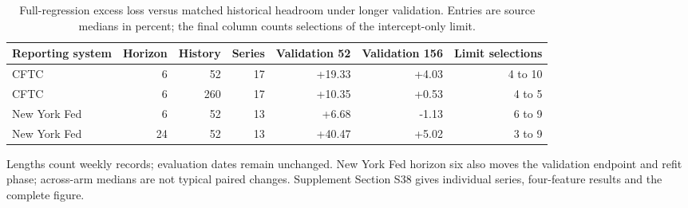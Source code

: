 \begin{table}[htbp]\centering\small
\caption{Full-regression excess loss versus matched historical headroom under longer validation. Entries are source medians in percent; the final column counts selections of the intercept-only limit.}\label{tab:v13-validation}
\begin{tabular}{lrrrrrr}\toprule
Reporting system & Horizon & History & Series & Validation 52 & Validation 156 & Limit selections\\\midrule
CFTC & 6 & 52 & 17 & +19.33 & +4.03 & 4 to 10 \\
CFTC & 6 & 260 & 17 & +10.35 & +0.53 & 4 to 5 \\
New York Fed & 6 & 52 & 13 & +6.68 & -1.13 & 6 to 9 \\
New York Fed & 24 & 52 & 13 & +40.47 & +5.02 & 3 to 9 \\
\bottomrule\end{tabular}
\par\vspace{2pt}\begin{minipage}{.98\linewidth}\footnotesize
Lengths count weekly records; evaluation dates remain unchanged. New York Fed horizon six also moves the validation endpoint and refit phase; across-arm medians are not typical paired changes.
Supplement Section S38 gives individual series, four-feature results and the complete figure.
\end{minipage}\end{table}
